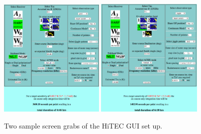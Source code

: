 \documentclass[legal,11pt]{article}
\begin{document}
\begin{figure}
\centering

\includegraphics[width=0.45\textwidth]{grid.eps}
\includegraphics[width=0.455\textwidth]{jiggle.eps}

\caption{Two sample screen grabs of the HiTEC GUI set up.}
\label{fig:hitec}

\end{figure}
\end{document}
